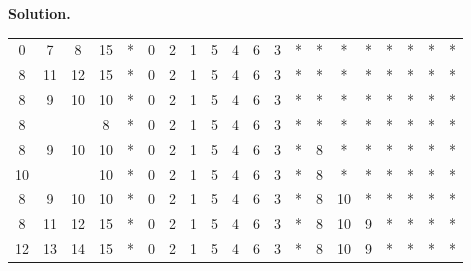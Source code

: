 \documentclass[12pt, a4paper]{article}
\newenvironment{sol}[1][Solution]
{\par\medskip\noindent \textbf{#1.} }
{\medskip}
\begin{document}
\begin{sol}
\begin{center}
\begin{tabular}{cccc|cccccccccccccccc}
				{0} & {\color{red}7} & {8} & 15 &
				* & {\color{gray}0} & {\color{gray}2} & {\color{gray}1} & {\color{gray}5} & {\color{gray}4} & {\color{gray}6} & {\color{green}3} & * & * & * & * & * & * & * & * \\
				
				8 & 11 & 12 & 15 &
				* & {\color{gray}0} & {\color{gray}2} & {\color{gray}1} & {\color{gray}5} & {\color{gray}4} & {\color{gray}6} & {\color{gray}3} & * & * & * & * & * & * & * & * \\
				
				8 & 9 & 10 & 10 &
				* & {\color{gray}0} & {\color{gray}2} & {\color{gray}1} & {\color{gray}5} & {\color{gray}4} & {\color{gray}6} & {\color{gray}3} & * & * & * & * & * & * & * & * \\
				
				{\color{green}8} & {} & {} & 8 &
				* & {\color{gray}0} & {\color{gray}2} & {\color{gray}1} & {\color{gray}5} & {\color{gray}4} & {\color{gray}6} & {\color{gray}3} & * & * & * & * & * & * & * & * \\
				
				{8} & {\color{red}9} & {10} & 10 &
				* & {\color{gray}0} & {\color{gray}2} & {\color{gray}1} & {\color{gray}5} & {\color{gray}4} & {\color{gray}6} & {\color{gray}3} & * & {\color{green}8} & * & * & * & * & * & * \\
				
				{\color{green}10} & {} & {} & 10 &
				* & {\color{gray}0} & {\color{gray}2} & {\color{gray}1} & {\color{gray}5} & {\color{gray}4} & {\color{gray}6} & {\color{gray}3} & * & {\color{gray}8} & * & * & * & * & * & * \\
				
				{8} & {\color{green}9} & {\color{red}10} & 10 &
				* & {\color{gray}0} & {\color{gray}2} & {\color{gray}1} & {\color{gray}5} & {\color{gray}4} & {\color{gray}6} & {\color{gray}3} & * & {\color{gray}8} & {\color{green}10} & * & * & * & * & * \\
				
				{8} & {\color{red}11} & {\color{black}12} & 15 &
				* & {\color{gray}0} & {\color{gray}2} & {\color{gray}1} & {\color{gray}5} & {\color{gray}4} & {\color{gray}6} & {\color{gray}3} & * & {\color{gray}8} & {\color{gray}10} & {\color{green}9} & * & * & * & * \\
				
				{12} & {13} & {14} & 15 &
				* & {\color{gray}0} & {\color{gray}2} & {\color{gray}1} & {\color{gray}5} & {\color{gray}4} & {\color{gray}6} & {\color{gray}3} & * & {\color{gray}8} & {\color{gray}10} & {\color{gray}9} & * & * & * & * \\
				

\end{tabular}
\end{center}
\end{sol}
\end{document}

